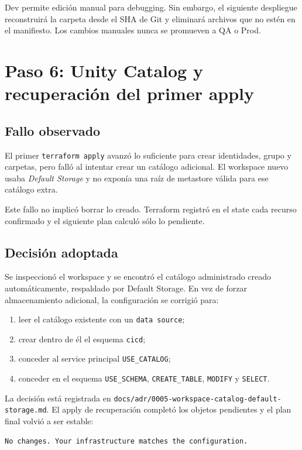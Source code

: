 \documentclass[11pt,a4paper]{article}
\begin{document}
Dev permite edición manual para debugging. Sin embargo, el siguiente despliegue reconstruirá la
carpeta desde el SHA de Git y eliminará archivos que no estén en el manifiesto. Los cambios manuales
nunca se promueven a QA o Prod.

\section{Paso 6: Unity Catalog y recuperación del primer apply}

\subsection{Fallo observado}

El primer \texttt{terraform apply} avanzó lo suficiente para crear identidades, grupo y carpetas,
pero falló al intentar crear un catálogo adicional. El workspace nuevo usaba
\textit{Default Storage} y no exponía una raíz de metastore válida para ese catálogo extra.

Este fallo no implicó borrar lo creado. Terraform registró en el state cada recurso confirmado y el
siguiente plan calculó sólo lo pendiente.

\subsection{Decisión adoptada}

Se inspeccionó el workspace y se encontró el catálogo administrado creado automáticamente, respaldado
por Default Storage. En vez de forzar almacenamiento adicional, la configuración se corrigió para:

\begin{enumerate}
  \item leer el catálogo existente con un \texttt{data source};
  \item crear dentro de él el esquema \texttt{cicd};
  \item conceder al service principal \texttt{USE\_CATALOG};
  \item conceder en el esquema \texttt{USE\_SCHEMA}, \texttt{CREATE\_TABLE}, \texttt{MODIFY} y
  \texttt{SELECT}.
\end{enumerate}

La decisión está registrada en \texttt{docs/adr/0005-workspace-catalog-default-storage.md}. El apply
de recuperación completó los objetos pendientes y el plan final volvió a ser estable:

\begin{lstlisting}
No changes. Your infrastructure matches the configuration.
\end{lstlisting}
\end{document}
